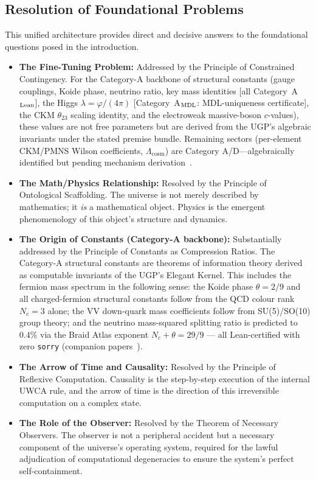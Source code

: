 \documentclass[12pt]{article}
\begin{document}
\subsection{Resolution of Foundational Problems}
This unified architecture provides direct and decisive answers to the foundational questions posed in the introduction.
\begin{itemize}[itemsep=0.5em, leftmargin=*]
    \item \textbf{The Fine-Tuning Problem:} Addressed by the Principle of Constrained Contingency. For the Category-A backbone of structural constants (gauge couplings, Koide phase, neutrino ratio, key mass identities [all Category~A$_{\rm Lean}$], the Higgs $\lambda = \varphi/(4\pi)$ [Category~A$_{\rm MDL}$: MDL-uniqueness certificate], the CKM $\theta_{23}$ scaling identity, and the electroweak massive-boson $c$-values), these values are not free parameters but are derived from the UGP's algebraic invariants under the stated premise bundle. Remaining sectors (per-element CKM/PMNS Wilson coefficients, $\Lambda_\mathrm{cosm}$) are Category A/D---algebraically identified but pending mechanism derivation~\cite{Spivack2026_SM_UGP}.
    \item \textbf{The Math/Physics Relationship:} Resolved by the Principle of Ontological Scaffolding. The universe is not merely described by mathematics; it \emph{is} a mathematical object. Physics is the emergent phenomenology of this object's structure and dynamics.
    \item \textbf{The Origin of Constants (Category-A backbone):} Substantially addressed by the Principle of Constants as Compression Ratios. The Category-A structural constants are theorems of information theory derived as computable invariants of the UGP's Elegant Kernel. This includes the fermion mass spectrum in the following sense: the Koide phase $\theta=2/9$ and all charged-fermion structural constants follow from the QCD colour rank $N_c=3$ alone; the VV down-quark mass coefficients follow from SU(5)/SO(10) group theory; and the neutrino mass-squared splitting ratio is predicted to $0.4\%$ via the Braid Atlas exponent $N_c+\theta=29/9$ --- all Lean-certified with zero \texttt{sorry} (companion papers~\cite{Spivack2026_Koide,Spivack2026_CyclotomicMass,Spivack2026_SM_UGP}).
    \item \textbf{The Arrow of Time and Causality:} Resolved by the Principle of Reflexive Computation. Causality is the step-by-step execution of the internal UWCA rule, and the arrow of time is the direction of this irreversible computation on a complex state.
    \item \textbf{The Role of the Observer:} Resolved by the Theorem of Necessary Observers. The observer is not a peripheral accident but a necessary component of the universe's operating system, required for the lawful adjudication of computational degeneracies to ensure the system's perfect self-containment.
\end{itemize}
\end{document}
